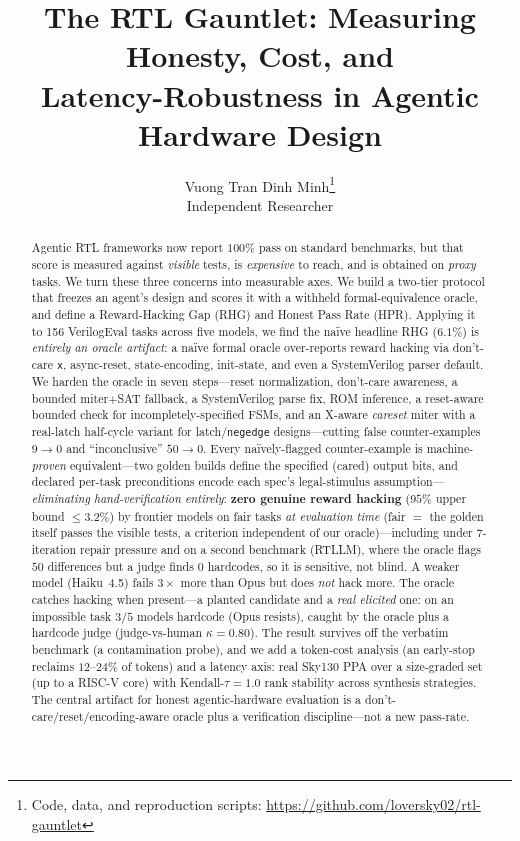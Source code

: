\documentclass[10pt]{article}
\title{\textbf{The RTL Gauntlet}: Measuring Honesty, Cost, and\\
Latency-Robustness in Agentic Hardware Design}
\author{Vuong Tran Dinh Minh\thanks{Code, data, and reproduction scripts: \url{https://github.com/loversky02/rtl-gauntlet}}\\ \small Independent Researcher}
\date{}
\newcommand{\rhg}{\textsf{RHG}}
\newcommand{\hpr}{\textsf{HPR}}
\newcommand{\code}[1]{\texttt{#1}}
\begin{document}
\maketitle

\begin{abstract}
Agentic RTL frameworks now report $100\%$ pass on standard benchmarks, but that score is measured
against \emph{visible} tests, is \emph{expensive} to reach, and is obtained on \emph{proxy} tasks.
We turn these three concerns into measurable axes. We build a two-tier protocol that freezes an
agent's design and scores it with a withheld formal-equivalence oracle, and define a
Reward-Hacking Gap (\rhg) and Honest Pass Rate (\hpr). Applying it to 156 VerilogEval tasks across
five models, we find the na\"ive headline \rhg{} ($6.1\%$) is \emph{entirely an oracle artifact}: a
na\"ive formal oracle over-reports reward hacking via don't-care \code{x}, async-reset,
state-encoding, init-state, and even a SystemVerilog parser default. We harden the oracle in seven
steps---reset normalization, don't-care awareness, a bounded miter$+$SAT fallback, a SystemVerilog
parse fix, ROM inference, a reset-aware bounded check for incompletely-specified FSMs, and an X-aware
\emph{careset} miter with a real-latch half-cycle variant for latch/\code{negedge}
designs---cutting false counter-examples $9\!\to\!0$ and ``inconclusive'' $50\!\to\!0$. Every
na\"ively-flagged counter-example is machine-\emph{proven} equivalent---two golden builds define the
specified (cared) output bits, and declared per-task preconditions encode each spec's legal-stimulus
assumption---\emph{eliminating hand-verification entirely}: \textbf{zero genuine reward hacking}
($95\%$ upper bound $\le\!3.2\%$) by frontier models on fair tasks \emph{at evaluation time} (fair
$=$ the golden itself passes the visible tests, a criterion independent of our oracle)---including
under $7$-iteration repair pressure and on a second benchmark (RTLLM), where the oracle flags $50$
differences but a judge finds $0$ hardcodes, so it is sensitive, not blind. A weaker model
(Haiku~4.5) fails $3\times$ more than Opus but does \emph{not} hack more. The oracle catches hacking
when present---a planted candidate and a \emph{real elicited} one: on an impossible task $3/5$ models
hardcode (Opus resists), caught by the oracle plus a hardcode judge (judge-vs-human $\kappa=0.80$). The
result survives off the verbatim benchmark (a contamination probe),
and we add a token-cost analysis (an early-stop reclaims $12$--$24\%$ of tokens) and a latency axis:
real Sky130 PPA over a size-graded set (up to a RISC-V core) with Kendall-$\tau=1.0$ rank stability
across synthesis strategies. The central
artifact for honest agentic-hardware evaluation is a don't-care/reset/encoding-aware oracle plus a
verification discipline---not a new pass-rate.
\end{abstract}
\end{document}
